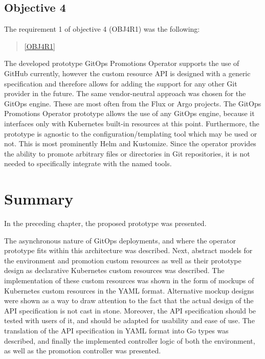 \subsection*{Objective 4}

The requirement 1 of objective 4 (OBJ4R1) was the following:

\begin{quotation}
	\noindent
	\ref{OBJ4R1}
\end{quotation}

The developed prototype GitOps Promotions Operator supports the use of GitHub currently,
however the custom resource API is designed with a generic specification and therefore allows
for adding the support for any other Git provider in the future.
The same vendor-neutral approach was chosen for the GitOps engine.
These are most often from the Flux or Argo projects.
The GitOps Promotions Operator prototype allows the use of any GitOps engine,
because it interfaces only with Kubernetes built-in resources at this point.
Furthermore, the prototype is agnostic to the configuration/templating tool which may be used or not.
This is most prominently Helm and Kustomize. Since the operator provides the ability
to promote arbitrary files or directories in Git repositories, it is not needed to specifically integrate
with the named tools.






\section{Summary}

In the preceding chapter,
the proposed prototype was presented.

The asynchronous nature of GitOps deployments, and where
the operator prototype fits within this architecture was described.
Next, abstract models for the environment and promotion custom resources as well as their prototype
design as declarative Kubernetes custom resources was described.
The implementation of these custom resources was shown in the form of mockups
of Kubernetes custom resources in the YAML format.
Alternative mockup designs were shown as a way to draw attention to the fact
that the actual design of the API specification is not cast in stone.
Moreover, the API specification should be tested with users of it,
and should be adapted for usability and ease of use.
The translation of the API specification in YAML format into Go types was described,
and finally the implemented controller logic of both the environment, as well as
the promotion controller was presented.

